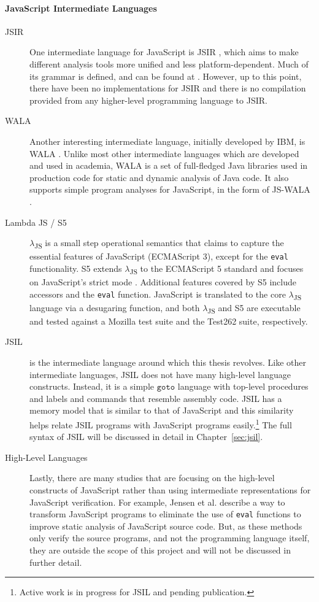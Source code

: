 \documentclass[a4paper,11pt,twoside]{report}
\begin{document}
\paragraph{JavaScript Intermediate Languages}
\begin{description}
\item[JSIR] One intermediate language for JavaScript is JSIR \cite{Livshits:2016:Misc}, which aims to make different analysis tools more unified and less platform-dependent. Much of its grammar is defined, and can be found at \cite{Livshits:2016:Misc}. However, up to this point, there have been no implementations for JSIR and there is no compilation provided from any higher-level programming language to JSIR.

\item[WALA] Another interesting intermediate language, initially developed by IBM, is WALA \cite{WALA}. Unlike most other intermediate languages which are developed and used in academia, WALA is a set of full-fledged Java libraries used in production code for static and dynamic analysis of Java code. It also supports simple program analyses for JavaScript, in the form of JS-WALA \cite{WALA2}.

\item[Lambda JS / S5] $\lambda$\textsubscript{JS} \cite{Guha:2010} is a small step operational semantics that claims to capture the essential features of JavaScript (ECMAScript 3), except for the \texttt{eval} functionality. S5 extends $\lambda$\textsubscript{JS} to the ECMAScript 5 standard and focuses on JavaScript's strict mode \cite{Politz:2012}. Additional features covered by S5 include accessors and the \texttt{eval} function. JavaScript is translated to the core $\lambda$\textsubscript{JS} language via a desugaring function, and both $\lambda$\textsubscript{JS} and S5 are executable and tested against a Mozilla test suite and the Test262 suite, respectively.

\item[JSIL] is the intermediate language around which this thesis revolves. Like other intermediate languages, JSIL does not have many high-level language constructs. Instead, it is a simple $\texttt{goto}$ language with top-level procedures and labels and commands that resemble assembly code. JSIL has a memory model that is similar to that of JavaScript and this similarity helps relate JSIL programs with JavaScript programs easily.\footnote{Active work is in progress for JSIL and pending publication.} The full syntax of JSIL will be discussed in detail in Chapter~\ref{sec:jsil}.

\item[High-Level Languages] Lastly, there are many studies that are focusing on the high-level constructs of JavaScript rather than using intermediate representations for JavaScript verification. For example, Jensen et al. \cite{unevalizer2012} describe a way to transform JavaScript programs to eliminate the use of \texttt{eval} functions to improve static analysis of JavaScript source code. But, as these methods only verify the source programs, and not the programming language itself, they are outside the scope of this project and will not be discussed in further detail.
\end{description}
\end{document}

